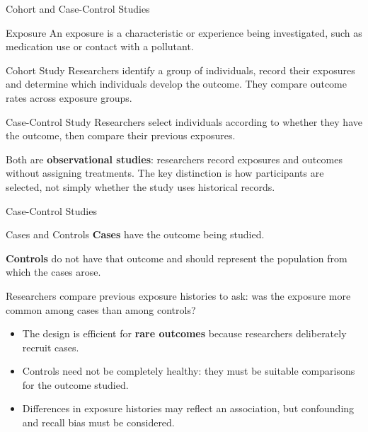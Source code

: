 \documentclass[aspectratio=169]{beamer}
\begin{document}
\begin{frame}{Cohort and Case-Control Studies}
\begin{block}{Exposure}
An exposure is a characteristic or experience being investigated, such as medication use or contact with a pollutant.
\end{block}

\begin{block}{Cohort Study}
Researchers identify a group of individuals, record their exposures and determine which individuals develop the outcome. They compare outcome rates across exposure groups.
\end{block}

\begin{block}{Case-Control Study}
Researchers select individuals according to whether they have the outcome, then compare their previous exposures.
\end{block}

Both are \textbf{observational studies}: researchers record exposures and outcomes without assigning treatments. The key distinction is how participants are selected, not simply whether the study uses historical records.
\end{frame}

\begin{frame}{Case-Control Studies}
\begin{block}{Cases and Controls}
\textbf{Cases} have the outcome being studied.

\textbf{Controls} do not have that outcome and should represent the population from which the cases arose.
\end{block}

Researchers compare previous exposure histories to ask: was the exposure more common among cases than among controls?

\begin{itemize}
	\item The design is efficient for \textbf{rare outcomes} because researchers deliberately recruit cases.
	\item Controls need not be completely healthy: they must be suitable comparisons for the outcome studied.
	\item Differences in exposure histories may reflect an association, but confounding and recall bias must be considered.
\end{itemize}
\end{frame}
\end{document}
